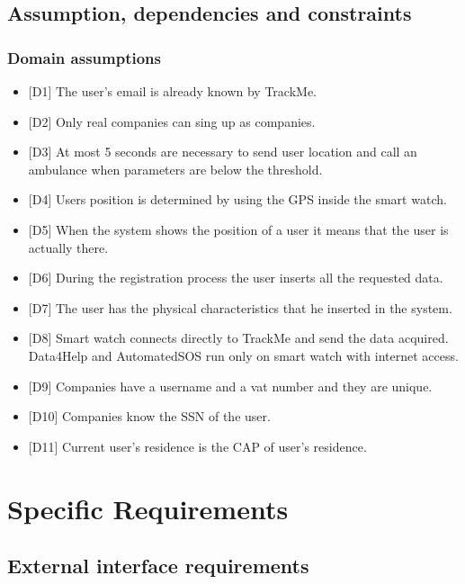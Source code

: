 \documentclass{article}
\begin{document}
\subsection{Assumption, dependencies and constraints}
\subsubsection{Domain assumptions}
\begin{itemize}
	\item {[D1]} The user's email is already known by TrackMe.
	\item {[D2]} Only real companies can sing up as companies.
	\item {[D3]}  At most 5 seconds are necessary to send user location and call an ambulance when parameters are below the threshold.
	\item {[D4]} Users position is determined by using the GPS inside the smart watch.
	\item {[D5]} When the system shows the position of a user it means that the user is
actually there.
	\item {[D6]} During the registration process the user inserts all the requested data.
	\item {[D7]} The user has the physical characteristics that he inserted in the system.
	\item {[D8]} Smart watch connects directly to TrackMe and send the data acquired. Data4Help and AutomatedSOS run only on smart watch with internet access.
	\item {[D9]} Companies have a username and a vat number and they are unique.
	\item {[D10]} Companies know the SSN of the user.  
	\item {[D11]} Current user's residence is the CAP of user's residence. 
\end{itemize}\newpage
\section{Specific Requirements}
\subsection{External interface requirements}
\end{document}
